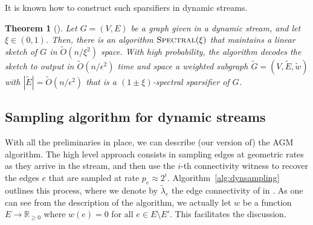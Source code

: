 \documentclass[epsfig,letter,11pt]{article}
\numberwithin{equation}{section}
\newcommand{\otil}{\tilde{O}}
\renewcommand{\tilde}{\widetilde}
\newtheorem{theorem}{Theorem}[section]
\begin{document}
It is known how to construct such sparsifiers in dynamic streams.
\begin{theorem}[\cite{spectralspars}]
	\label{th:spectral}
	Let $G=(V,E)$ be a graph given in a dynamic stream, and let $\xi \in (0,1)$. Then, there is an algorithm $\textsc{Spectral}(\xi)$ that maintains a linear sketch of $G$ in $\otil(n/\xi^2)$ space. With high probability, the algorithm decodes the sketch to output in $\otil(n/\epsilon^2)$ time and space a weighted subgraph  $\tilde{G} = (V,\tilde{E},\tilde{w})$ with $|\tilde{E}| = \otil(n/\epsilon^2)$ that is a $(1\pm \xi)$-spectral sparsifier of $G$.
\end{theorem}

\subsection{Sampling algorithm for dynamic streams}
\label{subsec:properties}
With all the preliminaries in place, we can describe (our version of) the AGM algorithm. The high level approach consists in sampling edges at geometric rates as they arrive in the stream, and then use the $i$-th connectivity witness to recover the edges $e$ that are sampled at rate $p_e \approx 2^i$. Algorithm~\ref{alg:dynsampling} outlines this process, where we denote by $\tilde{\lambda}_e$ the edge connectivity of  in \smash{$\tilde{G}$}. As one can see from the description of the algorithm, we actually let $w$ be a function $E \rightarrow \mathbb{R}_{\ge 0}$ where $w(e)=0$ for all $e \in E \setminus E'$. This facilitates the discussion.
\end{document}
